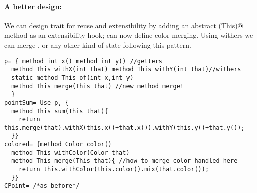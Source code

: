 \paragraph{A better design:}
We can design trait \Q@p@ for reuse and extensibility
by adding an abstract \Q@merge(This)@ method as an extensibility hook;
\Q@colored@ can now define color merging.
Using withers we can merge \Q@color@s, or any other kind of state 
following this pattern.%
 \begin{lstlisting}
p= { method int x() method int y() //getters
  method This withX(int that) method This withY(int that)//withers
  static method This of(int x,int y)
  method This merge(This that) //new method merge!
  }
pointSum= Use p, { 
  method This sum(This that){
    return this.merge(that).withX(this.x()+that.x()).withY(this.y()+that.y());
  }}
colored= {method Color color()
  method This withColor(Color that)
  method This merge(This that){ //how to merge color handled here
    return this.withColor(this.color().mix(that.color());
  }}
CPoint= /*as before*/
\end{lstlisting}  

